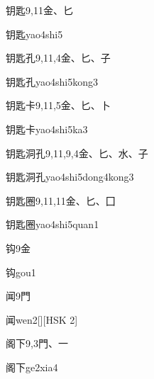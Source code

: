 \begin{entry}{钥匙}{9,11}{⾦、⼔}
  \begin{phonetics}{钥匙}{yao4shi5}
  \end{phonetics}
\end{entry}

\begin{entry}{钥匙孔}{9,11,4}{⾦、⼔、⼦}
  \begin{phonetics}{钥匙孔}{yao4shi5kong3}
  \end{phonetics}
\end{entry}

\begin{entry}{钥匙卡}{9,11,5}{⾦、⼔、⼘}
  \begin{phonetics}{钥匙卡}{yao4shi5ka3}
  \end{phonetics}
\end{entry}

\begin{entry}{钥匙洞孔}{9,11,9,4}{⾦、⼔、⽔、⼦}
  \begin{phonetics}{钥匙洞孔}{yao4shi5dong4kong3}
  \end{phonetics}
\end{entry}

\begin{entry}{钥匙圈}{9,11,11}{⾦、⼔、⼞}
  \begin{phonetics}{钥匙圈}{yao4shi5quan1}
  \end{phonetics}
\end{entry}

\begin{entry}{钩}{9}{⾦}
  \begin{phonetics}{钩}{gou1}
  \end{phonetics}
\end{entry}

\begin{entry}{闻}{9}{⾨}
  \begin{phonetics}{闻}{wen2}[][HSK 2]
  \end{phonetics}
\end{entry}

\begin{entry}{阁下}{9,3}{⾨、⼀}
  \begin{phonetics}{阁下}{ge2xia4}
  \end{phonetics}
\end{entry}

